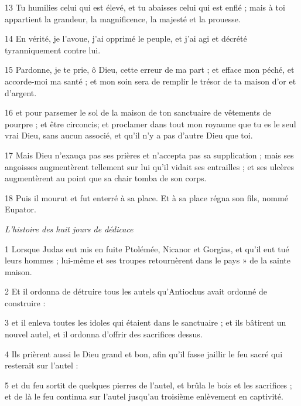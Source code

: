 \par 13 Tu humilies celui qui est élevé, et tu abaisses celui qui est enflé ; mais à toi appartient la grandeur, la magnificence, la majesté et la prouesse.

\par 14 En vérité, je l'avoue, j'ai opprimé le peuple, et j'ai agi et décrété tyranniquement contre lui.

\par 15 Pardonne, je te prie, ô Dieu, cette erreur de ma part ; et efface mon péché, et accorde-moi ma santé ; et mon soin sera de remplir le trésor de ta maison d'or et d'argent.

\par 16 et pour parsemer le sol de la maison de ton sanctuaire de vêtements de pourpre ; et être circoncis; et proclamer dans tout mon royaume que tu es le seul vrai Dieu, sans aucun associé, et qu'il n'y a pas d'autre Dieu que toi.

\par 17 Mais Dieu n'exauça pas ses prières et n'accepta pas sa supplication ; mais ses angoisses augmentèrent tellement sur lui qu'il vidait ses entrailles ; et ses ulcères augmentèrent au point que sa chair tomba de son corps.

\par 18 Puis il mourut et fut enterré à sa place. Et à sa place régna son fils, nommé Eupator.


\par \textit{L'histoire des huit jours de dédicace}

\par 1 Lorsque Judas eut mis en fuite Ptolémée, Nicanor et Gorgias, et qu'il eut tué leurs hommes ; lui-même et ses troupes retournèrent dans le pays » de la sainte maison.

\par 2 Et il ordonna de détruire tous les autels qu'Antiochus avait ordonné de construire :

\par 3 et il enleva toutes les idoles qui étaient dans le sanctuaire ; et ils bâtirent un nouvel autel, et il ordonna d'offrir des sacrifices dessus.

\par 4 Ils prièrent aussi le Dieu grand et bon, afin qu'il fasse jaillir le feu sacré qui resterait sur l'autel :

\par 5 et du feu sortit de quelques pierres de l'autel, et brûla le bois et les sacrifices ; et de là le feu continua sur l'autel jusqu'au troisième enlèvement en captivité.

